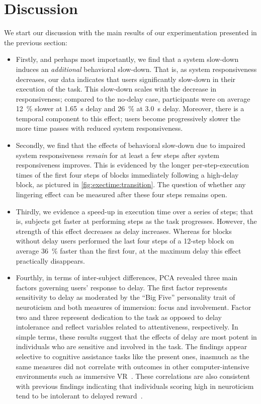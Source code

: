 \documentclass[10pt,letterpaper]{article}
\begin{document}
\section{Discussion}\label{sec:discussion}

We start our discussion with the main results of our experimentation presented in the previous section:

\begin{itemize}
  \item Firstly, and perhaps most importantly, we find that a system slow-down induces an \textit{additional} behavioral slow-down.
  That is, as system responsiveness decreases, our data indicates that users significantly slow-down in their execution of the task.
  This slow-down scales with the decrease in responsiveness; compared to the no-delay case, participants were on average \SI{12}{\percent} slower at \SI{1.65}{\second} delay and \SI{26}{\percent} at \SI{3.0}{\second} delay.
  Moreover, there is a temporal component to this effect; users become progressively slower the more time passes with reduced system responsiveness.

  \item Secondly, we find that the effects of behavioral slow-down due to impaired system responsiveness \emph{remain} for at least a few steps after system responsiveness improves.
  This is evidenced by the longer per-step-execution times of the first four steps of blocks immediately following a high-delay block, as pictured in \cref{fig:exectime:transition}.
  The question of whether any lingering effect can be measured after these four steps remains open.

  \item Thirdly, we evidence a speed-up in execution time over a series of steps; that is, subjects get faster at performing steps as the task progresses.
  However, the strength of this effect decreases as delay increases.
  Whereas for blocks without delay users performed the last four steps of a 12-step block on average \SI{36}{\percent} faster than the first four, at the maximum delay this effect practically disappears.

  \item Fourthly, in terms of inter-subject differences, PCA revealed three main factors governing users' response to delay. 
  The first factor represents sensitivity to delay as moderated by the ``Big Five'' personality trait of neuroticism and both measures of immersion: focus and involvement.
  Factor two and three represent dedication to the task as opposed to delay intolerance and reflect variables related to attentiveness, respectively.
  In simple terms, these results suggest that the effects of delay are most potent in individuals who are sensitive and involved in the task.
  The findings appear selective to cognitive assistance tasks like the present ones, inasmuch as the same measures did not correlate with outcomes in other computer-intensive environments such as immersive VR~\cite{quesnel2018you}.
  These correlations are also consistent with previous findings indicating that individuals scoring high in neuroticism tend to be intolerant to delayed reward~\cite{hirsh2008delay}.
\end{itemize}
\end{document}
